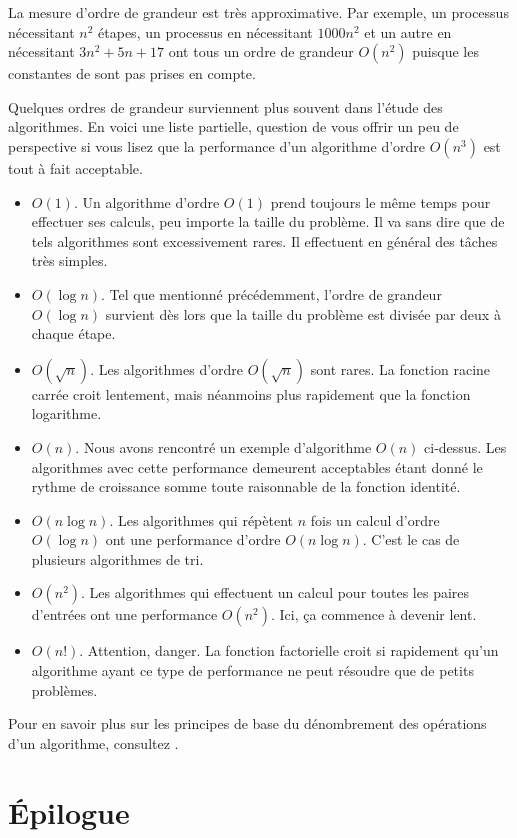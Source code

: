 La mesure d'ordre de grandeur est très approximative. Par exemple, un
processus nécessitant $n^2$ étapes, un processus en nécessitant
$1000n^2$ et un autre en nécessitant $3n^2 + 5n + 17$ ont tous un
ordre de grandeur $O(n^2)$ puisque les constantes de sont pas prises
en compte.

Quelques ordres de grandeur surviennent plus souvent dans l'étude des
algorithmes. En voici une liste partielle, question de vous offrir un
peu de perspective si vous lisez que la performance d'un algorithme
d'ordre $O(n^3)$ est tout à fait acceptable.

\begin{itemize}
\item $O(1)$. Un algorithme d'ordre $O(1)$ prend toujours le même
  temps pour effectuer ses calculs, peu importe la taille du problème.
  Il va sans dire que de tels algorithmes sont excessivement rares. Il
  effectuent en général des tâches très simples.
\item $O(\log n)$. Tel que mentionné précédemment, l'ordre de grandeur
  $O(\log n)$ survient dès lors que la taille du problème est divisée
  par deux à chaque étape.
\item $O(\sqrt{n})$. Les algorithmes d'ordre $O(\sqrt{n})$ sont rares.
  La fonction racine carrée croit lentement, mais néanmoins plus
  rapidement que la fonction logarithme.
\item $O(n)$. Nous avons rencontré un exemple d'algorithme $O(n)$
  ci-dessus. Les algorithmes avec cette performance demeurent
  acceptables étant donné le rythme de croissance somme toute
  raisonnable de la fonction identité.
\item $O(n \log n)$. Les algorithmes qui répètent $n$ fois un calcul
  d'ordre $O(\log n)$ ont une performance d'ordre $O(n \log n)$.
  C'est le cas de plusieurs algorithmes de tri.
\item $O(n^2)$. Les algorithmes qui effectuent un calcul pour toutes
  les paires d'entrées ont une performance $O(n^2)$. Ici, ça commence
  à devenir lent.
\item $O(n!)$. Attention, danger. La fonction factorielle croit si
  rapidement qu'un algorithme ayant ce type de performance ne peut
  résoudre que de petits problèmes.
\end{itemize}

Pour en savoir plus sur les principes de base du dénombrement des
opérations d'un algorithme, consultez
\citet[chapitre~1]{Stephens:algorithms:2013}.


\section{Épilogue}
\label{sec:algorithmes:epilogue}

